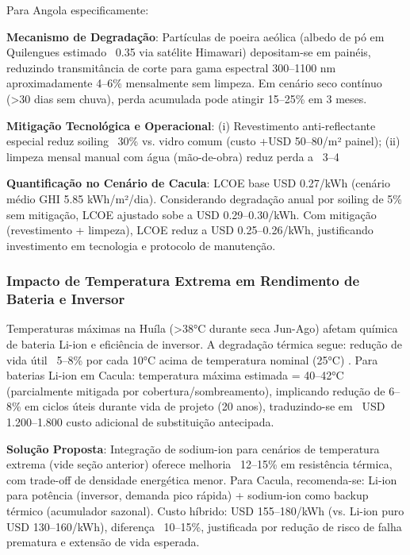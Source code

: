 \documentclass[12pt, a4paper]{article}
\begin{document}
Para Angola especificamente:

\textbf{Mecanismo de Degradação}: Partículas de poeira aeólica (albedo de pó em Quilengues estimado ~0.35 via satélite Himawari) depositam-se em painéis, reduzindo transmitância de corte para gama espectral 300--1100 nm aproximadamente 4--6\% mensalmente sem limpeza. Em cenário seco contínuo (>30 dias sem chuva), perda acumulada pode atingir 15--25\% em 3 meses.

\textbf{Mitigação Tecnológica e Operacional}: (i) Revestimento anti-reflectante especial reduz soiling ~30\% vs. vidro comum (custo +USD 50--80/m² painel); (ii) limpeza mensal manual com água (mão-de-obra) reduz perda a ~3--4%

\textbf{Quantificação no Cenário de Cacula}: LCOE base USD 0.27/kWh (cenário médio GHI 5.85 kWh/m²/dia). Considerando degradação anual por soiling de 5\% sem mitigação, LCOE ajustado sobe a USD 0.29--0.30/kWh. Com mitigação (revestimento + limpeza), LCOE reduz a USD 0.25--0.26/kWh, justificando investimento em tecnologia e protocolo de manutenção.

\subsubsection{Impacto de Temperatura Extrema em Rendimento de Bateria e Inversor}

Temperaturas máximas na Huíla (>38°C durante seca Jun-Ago) afetam química de bateria Li-ion e eficiência de inversor. A degradação térmica segue: redução de vida útil ~5--8\% por cada 10°C acima de temperatura nominal (25°C) \citep{Mukhopadhyay2025}. Para baterias Li-ion em Cacula: temperatura máxima estimada = 40--42°C (parcialmente mitigada por cobertura/sombreamento), implicando redução de 6--8\% em ciclos úteis durante vida de projeto (20 anos), traduzindo-se em ~USD 1.200--1.800 custo adicional de substituição antecipada.

\textbf{Solução Proposta}: Integração de sodium-ion para cenários de temperatura extrema (vide seção anterior) oferece melhoria ~12--15\% em resistência térmica, com trade-off de densidade energética menor. Para Cacula, recomenda-se: Li-ion para potência (inversor, demanda pico rápida) + sodium-ion como backup térmico (acumulador sazonal). Custo híbrido: USD 155--180/kWh (vs. Li-ion puro USD 130--160/kWh), diferença ~10--15\%, justificada por redução de risco de falha prematura e extensão de vida esperada.
\end{document}
